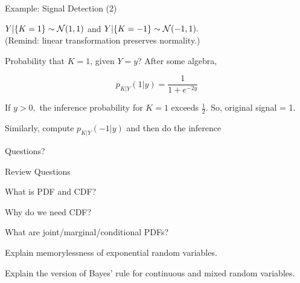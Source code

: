 \begin{frame}{Example: Signal Detection (2)}

\plitemsep 0.01in
\bci

\item<1-> $Y|\{K=1\} \sim \mathcal N(1,1)$ and $Y|\{K=-1\} \sim \mathcal N(-1,1).$ \\
(Remind: linear transformation preserves normality.)

\item<4-> Probability that $K=1$, given $Y=y$? After some algebra,

{
$$
p_{K|Y}(1|y) = \frac{1}{1+ e^{-2y}}
$$
\vspace{-0.3cm}
\bci
\item<6->  If $y >0,$ the inference probability for $K=1$ exceeds $\frac{1}{2}$. So, original signal = 1.
\item<7->  Similarly, compute $p_{K|Y}(-1|y)$ and then do the inference
\eci


}
{
\centering
{}
}

\eci

\end{frame}

\begin{frame}{}
\vspace{2cm}
\LARGE Questions?

\end{frame}

\begin{frame}{Review Questions}

\bce[1)]
\item What is PDF  and CDF?

\item Why do we need CDF?

\item What are joint/marginal/conditional PDFs?

\item Explain memorylessness of exponential random variables.

\item Explain the version of Bayes' rule for continuous and mixed random variables.

\ece

\end{frame}


